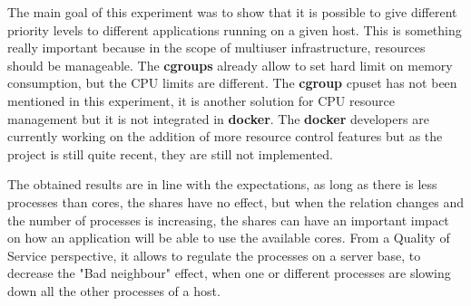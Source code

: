 The main goal of this experiment was to show that it is possible to give different
priority levels to different applications running on a given host. This is something
really important because in the scope of multiuser infrastructure, resources
should be manageable. The \textbf{cgroups} already allow to set hard limit on memory
consumption, but the CPU limits are different. The \textbf{cgroup} cpuset has not
been mentioned in this experiment, it is another solution for CPU resource
management but it is not integrated in \textbf{docker}. The \textbf{docker} developers
are currently working on the addition of more resource control features but as the project
is still quite recent, they are still not implemented.

The obtained results are in line with the expectations, as long as there is less processes
than cores, the shares have no effect, but when the relation changes and the number of
processes is increasing, the shares can have an important impact on how an application
will be able to use the available cores. From a Quality of Service perspective, it allows
to regulate the processes on a server base, to decrease the "Bad neighbour" effect, when
one or different processes are slowing down all the other processes of a host.

